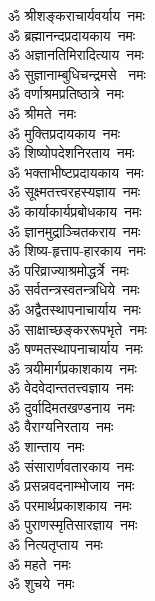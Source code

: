 \begin{multicols}{2}
    \begin{flushleft}
        ॐ श्रीशङ्कराचार्यवर्याय~नमः\\
        ॐ ब्रह्मानन्दप्रदायकाय~नमः\\
        ॐ अज्ञानतिमिरादित्याय~नमः\\
        ॐ सुज्ञानाम्बुधिचन्द्रमसे ~नमः\\
        ॐ वर्णाश्रमप्रतिष्ठात्रे~नमः\\
        ॐ श्रीमते~नमः\\
        ॐ मुक्तिप्रदायकाय~नमः\\
        ॐ शिष्योपदेशनिरताय~नमः\\
        ॐ भक्ताभीष्टप्रदायकाय~नमः\\
        ॐ सूक्ष्मतत्त्वरहस्यज्ञाय~नमः\hfill{}\\
                                        
        ॐ कार्याकार्यप्रबोधकाय~नमः\\
        ॐ ज्ञानमुद्राञ्चितकराय~नमः\\
        ॐ शिष्य-हृत्ताप-हारकाय~नमः\\
        ॐ परिव्राज्याश्रमोद्धर्त्रे~नमः\\
        ॐ सर्वतन्त्रस्वतन्त्रधिये~नमः\\
        ॐ अद्वैतस्थापनाचार्याय~नमः\\
        ॐ साक्षाच्छङ्कररूपभृते~नमः\\
        ॐ षण्मतस्थापनाचार्याय~नमः\\
        ॐ त्रयीमार्गप्रकाशकाय~नमः\\
        ॐ वेदवेदान्ततत्त्वज्ञाय~नमः\hfill{}\\
                                        
        ॐ दुर्वादिमतखण्डनाय~नमः\\
        ॐ वैराग्यनिरताय~नमः\\
        ॐ शान्ताय~नमः\\
        ॐ संसारार्णवतारकाय~नमः\\
        ॐ प्रसन्नवदनाम्भोजाय~नमः\\
        ॐ परमार्थप्रकाशकाय~नमः\\
        ॐ पुराणस्मृतिसारज्ञाय~नमः\\
        ॐ नित्यतृप्ताय~नमः\\
        ॐ महते~नमः\\
        ॐ शुचये~नमः\hfill{}\\
                                        

\end{flushleft}
\end{multicols}
